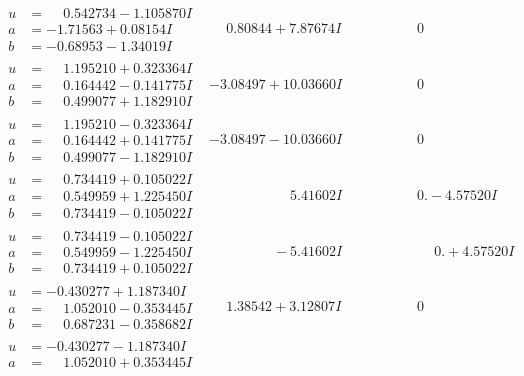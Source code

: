 \documentclass[1p]{elsarticle_modified}
\theoremstyle{definition}
\begin{document}
$$\begin{array}{c|c|c}
\begin{aligned}
u &= \phantom{-}0.542734 - 1.105870 I \\
a &= -1.71563 + 0.08154 I \\
b &= -0.68953 - 1.34019 I\end{aligned}
 & \phantom{-}0.80844 + 7.87674 I & \phantom{-0.000000 } 0 \\ \hline\begin{aligned}
u &= \phantom{-}1.195210 + 0.323364 I \\
a &= \phantom{-}0.164442 - 0.141775 I \\
b &= \phantom{-}0.499077 + 1.182910 I\end{aligned}
 & -3.08497 + 10.03660 I & \phantom{-0.000000 } 0 \\ \hline\begin{aligned}
u &= \phantom{-}1.195210 - 0.323364 I \\
a &= \phantom{-}0.164442 + 0.141775 I \\
b &= \phantom{-}0.499077 - 1.182910 I\end{aligned}
 & -3.08497 - 10.03660 I & \phantom{-0.000000 } 0 \\ \hline\begin{aligned}
u &= \phantom{-}0.734419 + 0.105022 I \\
a &= \phantom{-}0.549959 + 1.225450 I \\
b &= \phantom{-}0.734419 - 0.105022 I\end{aligned}
 & \phantom{-0.000000 -}5.41602 I & \phantom{-0.000000 } 0. - 4.57520 I \\ \hline\begin{aligned}
u &= \phantom{-}0.734419 - 0.105022 I \\
a &= \phantom{-}0.549959 - 1.225450 I \\
b &= \phantom{-}0.734419 + 0.105022 I\end{aligned}
 & \phantom{-0.000000 } -5.41602 I & \phantom{-0.000000 -}0. + 4.57520 I \\ \hline\begin{aligned}
u &= -0.430277 + 1.187340 I \\
a &= \phantom{-}1.052010 - 0.353445 I \\
b &= \phantom{-}0.687231 - 0.358682 I\end{aligned}
 & \phantom{-}1.38542 + 3.12807 I & \phantom{-0.000000 } 0 \\ \hline\begin{aligned}
u &= -0.430277 - 1.187340 I \\
a &= \phantom{-}1.052010 + 0.353445 I \\

\end{aligned}
\end{array}$$
\end{document}
